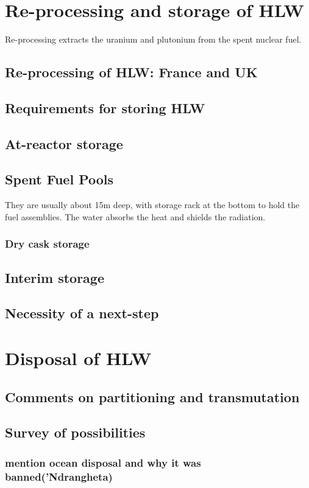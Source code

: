\documentclass[preprint,aip,pra]{revtex4-1}
\begin{document}
\section{Re-processing and storage of HLW}
    Re-processing extracts the uranium and plutonium from the spent
    nuclear fuel.
    \label{sec:reproc}
    \subsection{Re-processing of HLW: France and UK}
    \subsection{Requirements for storing HLW}
    \subsection{At-reactor storage}
        \subsection{Spent Fuel Pools}
        They are usually about 15m deep, with storage rack at the bottom to hold the fuel assemblies.
        The water absorbs the heat and shields the radiation.
        \subsubsection{Dry cask storage}
    \subsection{Interim storage}
    \subsection{Necessity of a next-step}

\section{Disposal of HLW}
    \subsection{Comments on partitioning and transmutation}
    \subsection{Survey of possibilities}
    \subsubsection{mention ocean disposal and why it was banned('Ndrangheta)}
\end{document}
